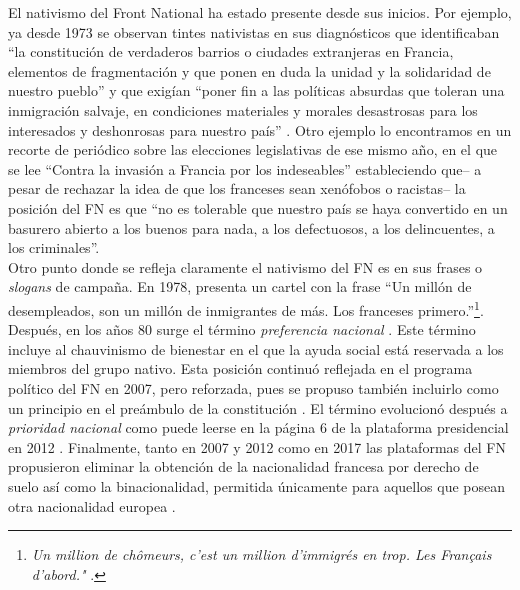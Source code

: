 El nativismo del Front National ha estado presente desde sus inicios. Por ejemplo, ya desde 1973 se observan tintes nativistas en sus diagnósticos que identificaban ``la constitución de verdaderos barrios o ciudades extranjeras en Francia, elementos de fragmentación y que ponen en duda la unidad y la solidaridad de nuestro pueblo'' y que exigían ``poner fin a las políticas absurdas que toleran una inmigración salvaje, en condiciones materiales y morales desastrosas para los interesados y deshonrosas para nuestro país'' \parencite[traducción propia]{LeMonde12}. Otro ejemplo lo encontramos en un recorte de periódico sobre las elecciones legislativas de ese mismo año, en el que se lee ``Contra la invasión a Francia por los indeseables'' estableciendo que-- a pesar de rechazar la idea de que los franceses sean xenófobos o racistas-- la posición del FN es que ``no es tolerable que nuestro país se haya convertido en un basurero abierto a los buenos para nada, a los defectuosos, a los delincuentes, a los criminales''\parencite[traducciones propias]{LeTemps17}.\\

Otro punto donde se refleja claramente el nativismo del FN es en sus frases o \textit{slogans} de campaña. En 1978, presenta un cartel con la frase ``Un millón de desempleados, son un millón de inmigrantes de más. Los franceses primero.''\footnote{\textit{Un million de chômeurs, c'est un million d'immigrés en trop. Les Français d'abord."} \parencite{LeMonde12}.}. Después, en los años 80 surge el término \textit{preferencia nacional} \parencite{LeTemps17}. Este término incluye al chauvinismo de bienestar en el que la ayuda social está reservada a los miembros del grupo nativo. Esta posición continuó reflejada en el programa político del FN en 2007, pero reforzada, pues se propuso también incluirlo como un principio en el preámbulo de la constitución \parencite{LObs07}. El término evolucionó después a \textit{prioridad nacional} como puede leerse en la página  6 de la plataforma presidencial en 2012 \parencite{LePen12}. Finalmente, tanto en 2007 y 2012 como en 2017 las plataformas del FN propusieron eliminar la obtención de la nacionalidad francesa por derecho de suelo así como la binacionalidad, permitida únicamente para aquellos que posean otra nacionalidad europea \parencites{LObs07}{LePen12}{BBC17}.\\

